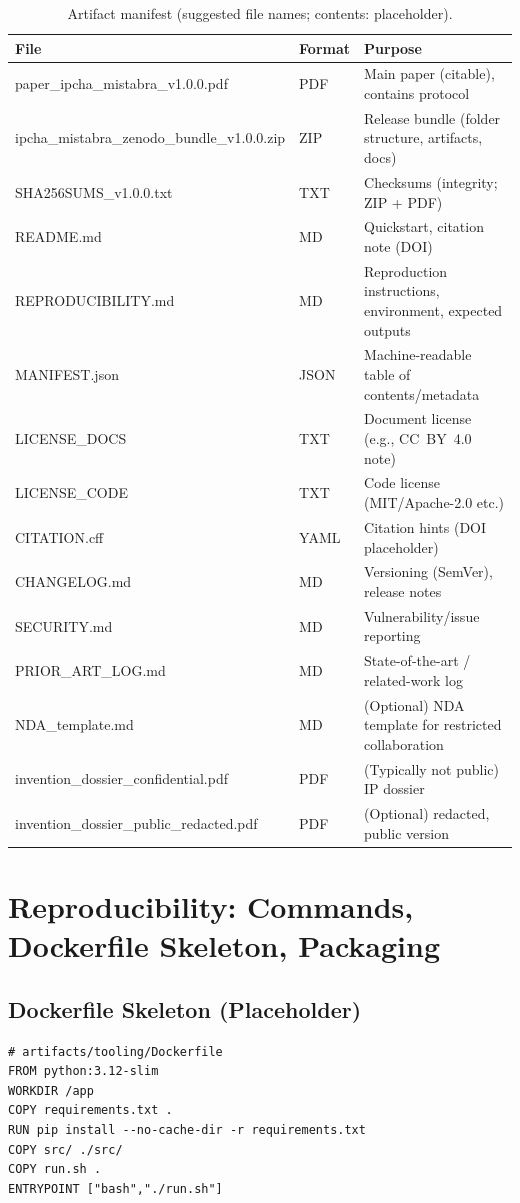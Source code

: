 \documentclass[11pt,a4paper]{article}
\newcommand{\version}{v1.0.0}
\begin{document}
\begin{table}[h]
\centering
\begin{tabular}{@{}llp{7.0cm}@{}}
\toprule
File & Format & Purpose \\ \midrule
paper\_ipcha\_mistabra\_\version.pdf & PDF & Main paper (citable), contains protocol \\
ipcha\_mistabra\_zenodo\_bundle\_\version.zip & ZIP & Release bundle (folder structure, artifacts, docs) \\
SHA256SUMS\_\version.txt & TXT & Checksums (integrity; ZIP + PDF) \\
README.md & MD & Quickstart, citation note (DOI) \\
REPRODUCIBILITY.md & MD & Reproduction instructions, environment, expected outputs \\
MANIFEST.json & JSON & Machine-readable table of contents/metadata \\
LICENSE\_DOCS & TXT & Document license (e.g., CC~BY~4.0 note) \\
LICENSE\_CODE & TXT & Code license (MIT/Apache-2.0 etc.) \\
CITATION.cff & YAML & Citation hints (DOI placeholder) \\
CHANGELOG.md & MD & Versioning (SemVer), release notes \\
SECURITY.md & MD & Vulnerability/issue reporting \\
PRIOR\_ART\_LOG.md & MD & State-of-the-art / related-work log \\
NDA\_template.md & MD & (Optional) NDA template for restricted collaboration \\
invention\_dossier\_confidential.pdf & PDF & (Typically not public) IP dossier \\
invention\_dossier\_public\_redacted.pdf & PDF & (Optional) redacted, public version \\ \bottomrule
\end{tabular}
\caption{Artifact manifest (suggested file names; contents: placeholder).}
\end{table}

\section{Reproducibility: Commands, Dockerfile Skeleton, Packaging}

\subsection*{Dockerfile Skeleton (Placeholder)}
\begin{verbatim}
# artifacts/tooling/Dockerfile
FROM python:3.12-slim
WORKDIR /app
COPY requirements.txt .
RUN pip install --no-cache-dir -r requirements.txt
COPY src/ ./src/
COPY run.sh .
ENTRYPOINT ["bash","./run.sh"]
\end{verbatim}
\end{document}
